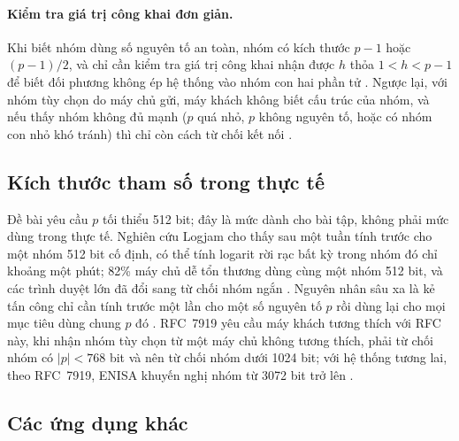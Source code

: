 \paragraph{Kiểm tra giá trị công khai đơn giản.}
Khi biết nhóm dùng số nguyên tố an toàn, nhóm có kích thước $p-1$ hoặc $(p-1)/2$,
và chỉ cần kiểm tra giá trị công khai nhận được $h$ thỏa $1 < h < p-1$ để biết đối phương không ép hệ thống vào nhóm
con hai phần tử \cite{rfc9846,rfc7919}. Ngược lại, với nhóm tùy chọn do máy chủ gửi, máy
khách không biết cấu trúc của nhóm, và nếu thấy nhóm không đủ mạnh ($p$ quá nhỏ,
$p$ không nguyên tố, hoặc có nhóm con nhỏ khó tránh) thì chỉ còn cách từ chối kết
nối \cite{rfc7919}.

\subsection{Kích thước tham số trong thực tế}

Đề bài yêu cầu $p$ tối thiểu 512 bit; đây là mức dành cho bài tập, không phải mức
dùng trong thực tế. Nghiên cứu Logjam cho thấy sau một tuần tính trước cho một
nhóm 512 bit cố định, có thể tính logarit rời rạc bất kỳ trong nhóm đó chỉ khoảng
một phút; 82\% máy chủ dễ tổn thương dùng cùng một nhóm 512 bit, và các trình
duyệt lớn đã đổi sang từ chối nhóm ngắn \cite{logjam-cacm}. Nguyên nhân sâu xa là
kẻ tấn công chỉ cần tính trước một lần cho một số nguyên tố $p$ rồi dùng lại cho
mọi mục tiêu dùng chung $p$ đó \cite{logjam-cacm}. RFC~7919 yêu cầu máy khách tương thích với RFC này, khi nhận nhóm tùy chọn từ một máy chủ không tương thích, phải từ chối nhóm có $|p| < 768$ bit và nên từ chối nhóm dưới 1024 bit; với
hệ thống tương lai, theo RFC~7919, ENISA khuyến nghị nhóm từ 3072 bit trở lên \cite{rfc7919}.

\subsection{Các ứng dụng khác}

